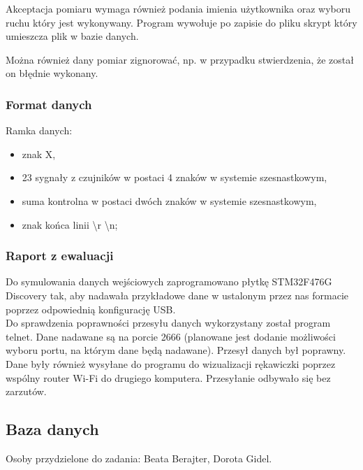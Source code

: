 ﻿\documentclass{article}
\begin{document}
Akceptacja pomiaru wymaga również podania imienia użytkownika oraz wyboru ruchu który jest wykonywany. Program wywołuje po zapisie do pliku skrypt który umieszcza plik w bazie danych.

Można również dany pomiar zignorować, np. w przypadku stwierdzenia, że został on błędnie wykonany.

\subsubsection{Format danych}
Ramka danych:
\begin{itemize}
    \item znak X,
    \item 23 sygnały z czujników w postaci 4 znaków w systemie szesnastkowym,
    \item suma kontrolna w postaci dwóch znaków w systemie szesnastkowym,
    \item znak końca linii \textbackslash r \textbackslash n;
\end{itemize}

\subsubsection{Raport z ewaluacji}
Do symulowania danych wejściowych zaprogramowano płytkę STM32F476G Discovery tak, aby nadawała przykładowe dane w ustalonym przez nas formacie poprzez odpowiednią konfigurację USB. \\
Do sprawdzenia poprawności przesyłu danych wykorzystany został program telnet. Dane nadawane są na porcie 2666 (planowane jest dodanie możliwości wyboru portu, na którym dane będą nadawane). Przesył danych był poprawny. \\
Dane były również wysyłane do programu do wizualizacji rękawiczki poprzez wspólny router Wi-Fi do drugiego komputera. Przesyłanie odbywało się bez zarzutów.

\subsection{Baza danych}
Osoby przydzielone do zadania: Beata Berajter, Dorota Gidel.
\end{document}
